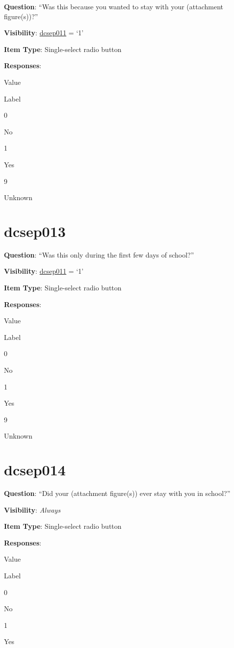 \documentclass[]{book}
\begin{document}
\textbf{Question}: ``Was this because you wanted to stay with your (attachment figure(s))?''

\textbf{Visibility}: \protect\hyperlink{dcsep011}{dcsep011} = `1'

\textbf{Item Type}: Single-select radio button

\textbf{Responses}:

Value

Label

0

No

1

Yes

9

Unknown

\hypertarget{dcsep013}{%
\section{dcsep013}\label{dcsep013}}

\textbf{Question}: ``Was this only during the first few days of school?''

\textbf{Visibility}: \protect\hyperlink{dcsep011}{dcsep011} = `1'

\textbf{Item Type}: Single-select radio button

\textbf{Responses}:

Value

Label

0

No

1

Yes

9

Unknown

\hypertarget{dcsep014}{%
\section{dcsep014}\label{dcsep014}}

\textbf{Question}: ``Did your (attachment figure(s)) ever stay with you in school?''

\textbf{Visibility}: \emph{Always}

\textbf{Item Type}: Single-select radio button

\textbf{Responses}:

Value

Label

0

No

1

Yes
\end{document}
